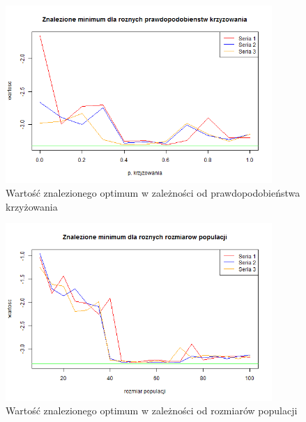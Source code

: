 \documentclass[11pt, a4paper]{article}
\begin{document}
\begin{figure}[H]
	\begin{center}
		\includegraphics[width=0.9\textwidth]{./assets/Hartman63.png} %
		\caption{Wartość znalezionego optimum w zależności od prawdopodobieństwa krzyżowania}
		\label{fig:hartman63}
	\end{center}
\end{figure}

\begin{figure}[H]
	\begin{center}
		\includegraphics[width=0.9\textwidth]{./assets/Hartman64.png} %
		\caption{Wartość znalezionego optimum w zależności od rozmiarów populacji}
		\label{fig:hartman64}
	\end{center}
\end{figure}
\end{document}
